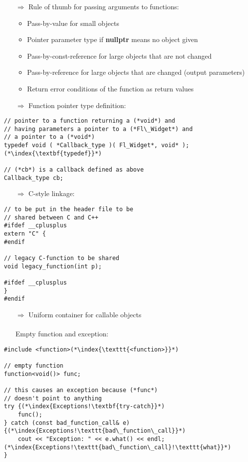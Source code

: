 \documentclass[10pt]{book}
\begin{document}
\begin{enumerate}
\item[$\Rightarrow$] Rule of thumb for passing arguments to functions:
\begin{itemize}
\item Pass-by-value for small objects
\item Pointer parameter type if \textbf{nullptr} means no object given
\item Pass-by-const-reference for large objects that are not changed
\item Pass-by-reference for large objects that are changed (output parameters)
\item Return error conditions of the function as return values
\end{itemize}
\end{enumerate}
\begin{enumerate}
\item[$\Rightarrow$] Function pointer type definition:
\end{enumerate}
\begin{lstlisting}
// pointer to a function returning a (*void*) and
// having parameters a pointer to a (*Fl\_Widget*) and
// a pointer to a (*void*)
typedef void ( *Callback_type )( Fl_Widget*, void* ); (*\index{\textbf{typedef}}*)

// (*cb*) is a callback defined as above
Callback_type cb;
\end{lstlisting}
\begin{enumerate}
\item[$\Rightarrow$] C-style linkage:
\end{enumerate}
\begin{lstlisting}
// to be put in the header file to be
// shared between C and C++
#ifdef __cplusplus
extern "C" {
#endif

// legacy C-function to be shared
void legacy_function(int p);

#ifdef __cplusplus
}
#endif
\end{lstlisting}
\begin{enumerate}
\item[$\Rightarrow$] Uniform container for callable objects\\ \\ Empty function and exception:
\end{enumerate}
\begin{lstlisting}
#include <function>(*\index{\texttt{<function>}}*)

// empty function
function<void()> func;

// this causes an exception because (*func*) 
// doesn't point to anything
try {(*\index{Exceptions!\textbf{try-catch}}*)
    func();
} catch (const bad_function_call& e) {(*\index{Exceptions!\texttt{bad\_function\_call}}*)
    cout << "Exception: " << e.what() << endl;(*\index{Exceptions!\texttt{bad\_function\_call}!\texttt{what}}*)
}
\end{lstlisting}
\end{document}
